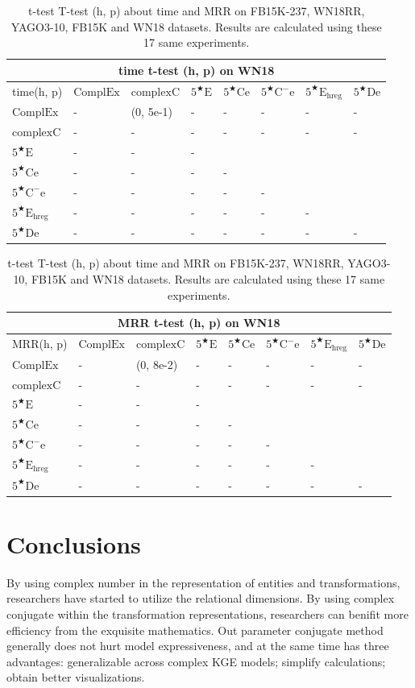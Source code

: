 \documentclass[11pt]{article}
\begin{document}
\begin{table}
\begin{tabular}{llllllll}
    \hline
    \multicolumn{8}{c}{time t-test (h, p) on WN18}\\
    \hline
    time(h, p) & $\mathrm{ComplEx}$ & $\mathrm{complexC}$ & $5^{\bigstar}\mathrm{E}$ & $5^{\bigstar}\mathrm{Ce}$ & $5^{\bigstar}\mathrm{C^{-}e}$ & $5^{\bigstar}\mathrm{E_{hreg}}$ & $5^{\bigstar}\mathrm{De}$\\
    $\mathrm{ComplEx}$ & - & (0, 5e-1) & - & - & - & - & - \\
    $\mathrm{complexC}$ & - & - & - & - & - & - & - \\
    $5^{\bigstar}\mathrm{E}$ & - & - & -\\
    $5^{\bigstar}\mathrm{Ce}$ & - & - & - & -\\
    $5^{\bigstar}\mathrm{C^{-}e}$ & - & - & - & - & -\\
    $5^{\bigstar}\mathrm{E_{hreg}}$ & - & - & - & - & - & -\\
    $5^{\bigstar}\mathrm{De}$ & - & - & - & - & - & - & -\\
    \hline
\end{tabular}
\begin{tabular}{llllllll}
    \hline
    \multicolumn{8}{c}{MRR t-test (h, p) on WN18}\\
    \hline
    MRR(h, p) & $\mathrm{ComplEx}$ & $\mathrm{complexC}$ & $5^{\bigstar}\mathrm{E}$ & $5^{\bigstar}\mathrm{Ce}$ & $5^{\bigstar}\mathrm{C^{-}e}$ & $5^{\bigstar}\mathrm{E_{hreg}}$ & $5^{\bigstar}\mathrm{De}$\\
    $\mathrm{ComplEx}$ & - & (0, 8e-2) & - & - & - & - & - \\
    $\mathrm{complexC}$ & - & - & - & - & - & - & - \\
    $5^{\bigstar}\mathrm{E}$ & - & - & -\\
    $5^{\bigstar}\mathrm{Ce}$ & - & - & - & -\\
    $5^{\bigstar}\mathrm{C^{-}e}$ & - & - & - & - & -\\
    $5^{\bigstar}\mathrm{E_{hreg}}$ & - & - & - & - & - & -\\
    $5^{\bigstar}\mathrm{De}$ & - & - & - & - & - & - & -\\
    \hline
\end{tabular}
\caption{t-test
T-test (h, p) about time and MRR on FB15K-237, WN18RR, YAGO3-10, FB15K and WN18 datasets.
Results are calculated using these 17 same experiments.
}
\label{ttest}
\end{table}

\section{Conclusions}
By using complex number in the representation of entities and transformations, researchers have started to utilize the relational dimensions.
By using complex conjugate within the transformation representations, researchers can benifit more efficiency from the exquisite mathematics.
Out parameter conjugate method generally does not hurt model expressiveness, and at the same time has three advantages:
generalizable across complex KGE models; 
simplify calculations;
obtain better visualizations.
\end{document}

